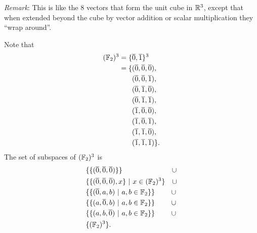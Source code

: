 \documentclass[12pt]{article}
\begin{document}
\begin{mdframed}
  \textit{Remark}: This is like the 8 vectors that form the unit cube in
  $\mathbb{R}^3$, except that when extended beyond the cube by vector addition or
  scalar multiplication they ``wrap around''.

  Note that
  \begin{align*}
    (\mathbb{F}_2)^3 = \{&\overline 0, \overline 1\}^3\\
             = \{&(\overline 0, \overline 0, \overline 0),\\
                 &(\overline 0, \overline 0, \overline 1),\\
                 &(\overline 0, \overline 1, \overline 0),\\
                 &(\overline 0, \overline 1, \overline 1),\\
                 &(\overline 1, \overline 0, \overline 0),\\
                 &(\overline 1, \overline 0, \overline 1),\\
                 &(\overline 1, \overline 1, \overline 0),\\
                 &(\overline 1, \overline 1, \overline 1)\}.
  \end{align*}
  The set of subspaces of $(\mathbb{F}_2)^3$ is
  \begin{align*}
    &\{\{(\overline 0, \overline 0, \overline 0)\}\} ~~~~~~~~~~~~~~~~~~~~~ \cup\\
    &\{\{(\overline 0, \overline 0, \overline 0), x\} ~|~ x \in (\mathbb{F}_2)^3\} ~~~ \cup\\
    &\{\{(\overline 0, a, b) ~|~ a, b \in \mathbb{F}_2\}\}  ~~~~~~~ \cup\\
    &\{\{(a, \overline 0, b) ~|~ a, b \in \mathbb{F}_2\}\}  ~~~~~~~ \cup\\
    &\{\{(a, b, \overline 0) ~|~ a, b \in \mathbb{F}_2\}\}  ~~~~~~~ \cup\\
    &\{(\mathbb{F}_2)^3\}.
  \end{align*}
\end{mdframed}
\end{document}
